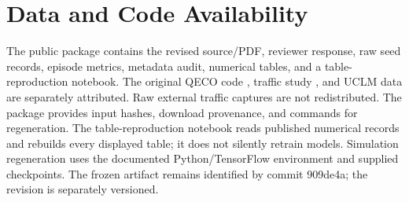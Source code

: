 \documentclass[conference]{IEEEtran}
\begin{document}
\section*{Data and Code Availability}
The public package \cite{StudyCode} contains the revised source/PDF, reviewer response, raw seed records, episode metrics, metadata audit, numerical tables, and a table-reproduction notebook. The original QECO code \cite{QECOCode}, traffic study \cite{Traffic}, and UCLM data \cite{UCLMData} are separately attributed. Raw external traffic captures are not redistributed. The package provides input hashes, download provenance, and commands for regeneration. The table-reproduction notebook reads published numerical records and rebuilds every displayed table; it does not silently retrain models. Simulation regeneration uses the documented Python/TensorFlow environment and supplied checkpoints. The frozen artifact remains identified by commit 909de4a; the revision is separately versioned.
\end{document}
